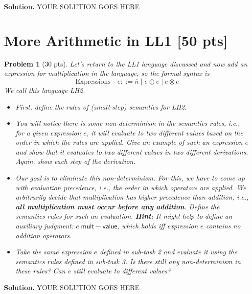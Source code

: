 \documentclass{article}
\newcommand{\m}[1]{\mathsf{#1}}
\newcommand{\num}[1]{\overline{#1}}
\newcommand{\multval}[1]{#1 \; \m{mult{-}value}}
\newtheorem{problem}{Problem}
\newenvironment{solution}{\textbf{Solution.}}{}
\begin{document}
\begin{solution}
    YOUR SOLUTION GOES HERE
\end{solution}

\section{More Arithmetic in LL1 [50 pts]} 


\begin{problem}[30 pts]
    Let's return to the LL1 language discussed and now add an expression for multiplication in the language,
    so the formal syntax is
    \[
        \text{Expressions} \quad e ::= \num{n} \mid e \oplus e \mid e \otimes e
    \]
    We call this language LH2.

    \begin{itemize}
        \item[(5 pts)] First, define the rules of (small-step) semantics for LH2.
        
        \item[(10 pts)] You will notice there is some non-determinism in the semantics rules, i.e., for a given expression $e$,
        it will evaluate to two different values based on the order in which the rules are applied. Give an example of such an
        expression $e$ and show that it evaluates to two different values in two different derivations.
        Again, show each step of the derivation.

        \item[(10 pts)] Our goal is to eliminate this non-determinism. For this, we have to come up with evaluation precedence,
        i.e., the order in which operators are applied. We arbitrarily decide that multiplication has higher precedence than
        addition, i.e., \textbf{all multiplication must occur before any addition}. Define the semantics rules for such an evaluation.
        \textbf{Hint:} It might help to define an auxiliary judgment: $\multval{e}$, which holds iff expression $e$ contains
        no addition operators.

        \item[(5 pts)] Take the same expression $e$ defined in sub-task 2 and evaluate it using the semantics rules defined
        in sub-task 3. Is there still any non-determinism in these rules? Can $e$ still evaluate to different values?
    \end{itemize}
\end{problem}

\begin{solution}
    YOUR SOLUTION GOES HERE
\end{solution}
\end{document}
